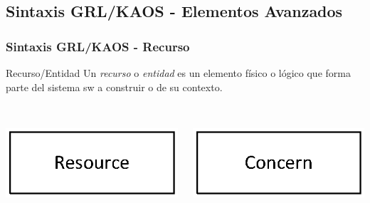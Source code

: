 \documentclass[handout,slidestop,xcolor=pst,dvips,blue]{beamer}
\begin{document}
\subsection[Sintaxis GRL/KAOS (II)]{Sintaxis GRL/KAOS - Elementos Avanzados}

\begin{frame}[c]
    \frametitle{Sintaxis GRL/KAOS - Recurso}
    \begin{block}{Recurso/Entidad}
        Un \alert{\emph{recurso}} o \alert{\emph{entidad}} es un elemento físico o lógico que forma parte del sistema sw a construir o de su contexto.
        \ \\
        \ \\
        \begin{columns}[c]
            \begin{column}{0.50\linewidth}
                \centering \includegraphics[width=0.5\columnwidth,keepaspectratio=true]{images/objetivos/resource(GRL).eps}
            \end{column}
            \begin{column}{0.50\linewidth}
                \centering \includegraphics[width=0.5\columnwidth,keepaspectratio=true]{images/objetivos/concern(KAOS).eps}
            \end{column}
        \end{columns}
    \end{block}
\end{frame}
\end{document}
